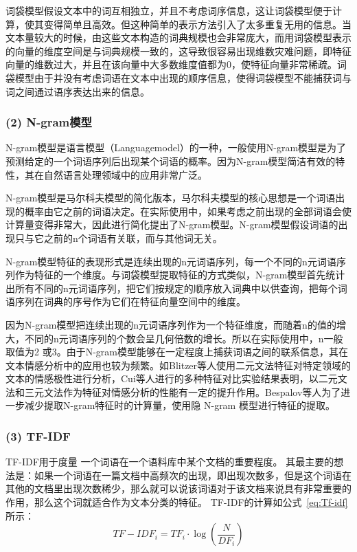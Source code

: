 \documentclass[cs4size,a4paper]{ctexart}
\numberwithin{equation}{section}
\numberwithin{table}{section}
\numberwithin{figure}{section}
\begin{document}
词袋模型假设文本中的词互相独立，并且不考虑词序信息，这让词袋模型便于计算，使其变得简单且高效。但这种简单的表示方法引入了太多重复无用的信息。当文本量较大的时候，由这些文本构造的词典规模也会非常庞大，而用词袋模型表示的向量的维度空间是与词典规模一致的，这导致很容易出现维数灾难问题，即特征向量的维数过大，并且在该向量中大多数维度值都为0，使特征向量非常稀疏。词袋模型由于并没有考虑词语在文本中出现的顺序信息，使得词袋模型不能捕获词与词之间通过语序表达出来的信息。

\subsubsection*{(2) N-gram模型}

N-gram模型是语言模型（Languagemodel）的一种，一般使用N-gram模型是为了预测给定的一个词语序列后出现某个词语的概率。因为N-gram模型简洁有效的特性，其在自然语言处理领域中的应用非常广泛。

N-gram模型是马尔科夫模型的简化版本，马尔科夫模型的核心思想是一个词语出现的概率由它之前的词语决定。在实际使用中，如果考虑之前出现的全部词语会使计算量变得非常大，因此进行简化提出了N-gram模型。N-gram模型假设词语的出现只与它之前的n个词语有关联，而与其他词无关。

N-gram模型特征的表现形式是连续出现的n元词语序列，每一个不同的n元词语序列作为特征的一个维度。与词袋模型提取特征的方式类似，N-gram模型首先统计出所有不同的n元词语序列，把它们按规定的顺序放入词典中以供查询，把每个词语序列在词典的序号作为它们在特征向量空间中的维度。

因为N-gram模型把连续出现的n元词语序列作为一个特征维度，而随着n的值的增大，不同的n元词语序列的个数会呈几何倍数的增长。所以在实际使用中，n一般取值为2 或3。由于N-gram模型能够在一定程度上捕获词语之间的联系信息，其在文本情感分析中的应用也较为频繁。如Blitzer等人使用二元文法特征对特定领域的文本的情感极性进行分析，Cui等人进行的多种特征对比实验结果表明，以二元文法和三元文法作为特征对情感分析的性能有一定的提升作用。Bespalov等人为了进一步减少提取N-gram特征时的计算量，使用隐 N-gram 模型进行特征的提取。

\subsubsection*{(3) TF-IDF}

TF-IDF用于度量
一个词语在一个语料库中某个文档的重要程度。
其最主要的想法是：如果一个词语在一篇文档中高频次的出现，即出现次数多，但是这个词语在其他的文档里出现次数稀少，那么就可以说该词语对于该文档来说具有非常重要的作用，那么这个词就适合作为文本分类的特征。
TF-IDF的计算如公式~\ref{eq:Tf-idf} 所示：
\begin{equation}\label{eq:Tf-idf}
{TF-IDF}_i = {TF}_i \cdot \log(\frac{N}{{DF}_i})
\end{equation}
\end{document}

